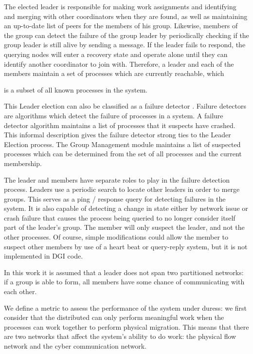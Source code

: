 The elected leader is responsible for making work assignments and identifying
and merging with other coordinators when they are found, as well as maintaining
an up-to-date list of peers for the members of his group.  Likewise, members of
the group can detect the failure of the group leader by periodically checking
if the group leader is still alive by sending a message. If the leader fails to
respond, the querying nodes will enter a recovery state and operate alone until
they can identify another coordinator to join with. Therefore, a leader and each
of the members maintain a set of processes which are currently reachable, which

is a subset of all known processes in the system.

This Leader election can also be classified as a failure detector
\cite{LEADERELECTIONEVAL}. Failure detectors are algorithms which detect the failure of processes in a
system. A failure detector algorithm maintains a list of processes that it suspects have
crashed. This informal description gives the failure detector strong ties to the
Leader Election process. The Group Management module maintains a list of
suspected processes which can be determined from the set of all processes and the current
membership.

The leader and members have separate roles to play in the failure detection
process. Leaders use a periodic search to locate other leaders in order to merge groups.
 This serves as a ping / response query for
detecting failures in the system. It is also capable of detecting a change in state either
by network issue or crash failure that causes the process being queried to no
longer consider itself part of the leader's group. The member will only suspect the leader, and not the other processes.
Of course, simple modifications could allow the member to suspect other members
by use of a heart beat or query-reply system, but it is not implemented in DGI code.

In this work it is assumed that a leader does not span two partitioned networks:
if a group is able to form, all members have some chance of communicating with
each other.

We define a metric to assess the performance of the system under duress: we
first consider that the distributed can only perform meaningful work when the
processes can work together to perform physical migration. This means that
there are two networks that affect the system's ability to do work: the
physical flow network and the cyber communication network.

